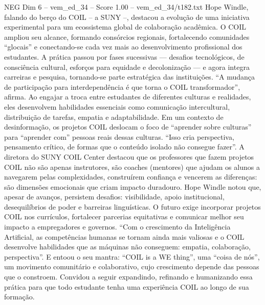 \begin{textsample}{NEG Dim 6 – vem\_ed\_34 – Score 1.00 – vem\_ed\_34/t182.txt}
Hope Windle, falando do berço do COIL – a SUNY –, destacou a evolução de uma iniciativa experimental para um ecossistema global de colaboração acadêmica.
O COIL ampliou seu alcance, formando consórcios regionais, fortalecendo comunidades “glocais” e conectando-se cada vez mais ao desenvolvimento profissional dos estudantes.
A prática passou por fases sucessivas — desafios tecnológicos, de consciência cultural, esforços para equidade e decolonização — e agora integra carreiras e pesquisa, tornando-se parte estratégica das instituições. “A mudança de participação para interdependência é que torna o COIL transformador”, afirma.
Ao engajar a troca entre estudantes de diferentes culturas e realidades, eles desenvolvem habilidades essenciais como comunicação intercultural, distribuição de tarefas, empatia e adaptabilidade.
Em um contexto de desinformação, os projetos COIL deslocam o foco de “aprender sobre culturas” para “aprender com” pessoas reais dessas culturas. “Isso cria perspectiva, pensamento crítico, de formas que o conteúdo isolado não consegue fazer”.
A diretora do SUNY COIL Center destacou que os professores que fazem projetos COIL não são apenas instrutores, são coaches (mentores) que ajudam os alunos a navegarem pelas complexidades, construírem confiança e vencerem as diferenças: são dimensões emocionais que criam impacto duradouro.
Hope Windle notou que, apesar de avanços, persistem desafios: visibilidade, apoio institucional, desequilíbrios de poder e barreiras linguísticas.
O futuro exige incorporar projetos COIL nos currículos, fortalecer parcerias equitativas e comunicar melhor seu impacto a empregadores e governos. “Com o crescimento da Inteligência Artificial, as competências humanas se tornam ainda mais valiosas e o COIL desenvolve habilidades que as máquinas não conseguem: empatia, colaboração, perspectiva”.
E entoou o seu mantra: “COIL is a WE thing”, uma “coisa de nós”, um movimento comunitário e colaborativo, cujo crescimento depende das pessoas que o constroem.
Convidou a seguir expandindo, refinando e humanizando essa prática para que todo estudante tenha uma experiência COIL ao longo de sua formação.

\end{textsample}
